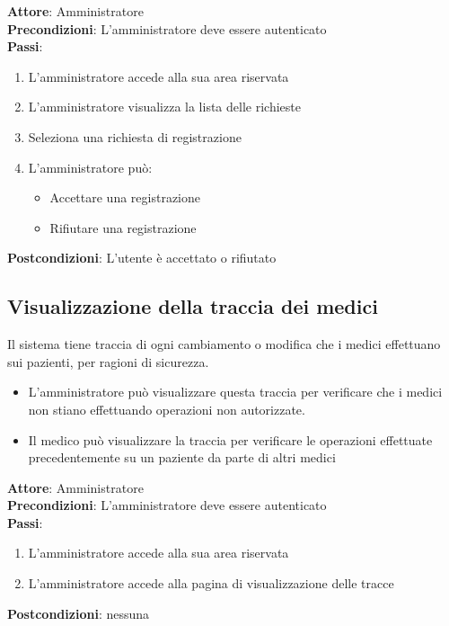 \documentclass[a4paper]{article}
\begin{document}
\begin{mdframed}
  \textbf{Attore}: Amministratore\\
  \textbf{Precondizioni}: L'amministratore deve essere autenticato\\
  \textbf{Passi}: 
  \begin{enumerate}[nosep]
    \item L'amministratore accede alla sua area riservata
    \item L'amministratore visualizza la lista delle richieste
    \item Seleziona una richiesta di registrazione
    \item L'amministratore può:
      \begin{itemize}
        \item  Accettare una registrazione
        \item  Rifiutare una registrazione
      \end{itemize}
  \end{enumerate}
  \textbf{Postcondizioni}: L'utente è accettato o rifiutato
\end{mdframed}

\subsection{Visualizzazione della traccia dei medici}

Il sistema tiene traccia di ogni cambiamento o modifica che i medici effettuano sui pazienti, per 
ragioni di sicurezza.

\begin{itemize}
  \item L'amministratore può visualizzare questa traccia per verificare 
    che i medici non stiano effettuando operazioni non autorizzate.
  \item Il medico può visualizzare la traccia per verificare le operazioni effettuate
    precedentemente su un paziente da parte di altri medici
\end{itemize}

\begin{mdframed}
  \textbf{Attore}: Amministratore\\
  \textbf{Precondizioni}: L'amministratore deve essere autenticato\\
  \textbf{Passi}: 
  \begin{enumerate}[nosep]
    \item L'amministratore accede alla sua area riservata
    \item L'amministratore accede alla pagina di visualizzazione delle tracce 
  \end{enumerate}
  \textbf{Postcondizioni}: nessuna
\end{mdframed}
\end{document}
